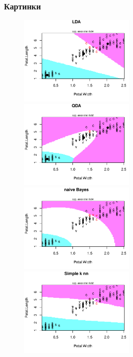 \subsubsection{Картинки}

	\begin{figure}[!h]
			\includegraphics[width=0.5\textwidth]{img/lda.pdf}
			\includegraphics[width=0.5\textwidth]{img/qda.pdf}\\
			\includegraphics[width=0.5\textwidth]{img/nbda.pdf}
			\includegraphics[width=0.5\textwidth]{img/sknn.pdf}
	\end{figure}

